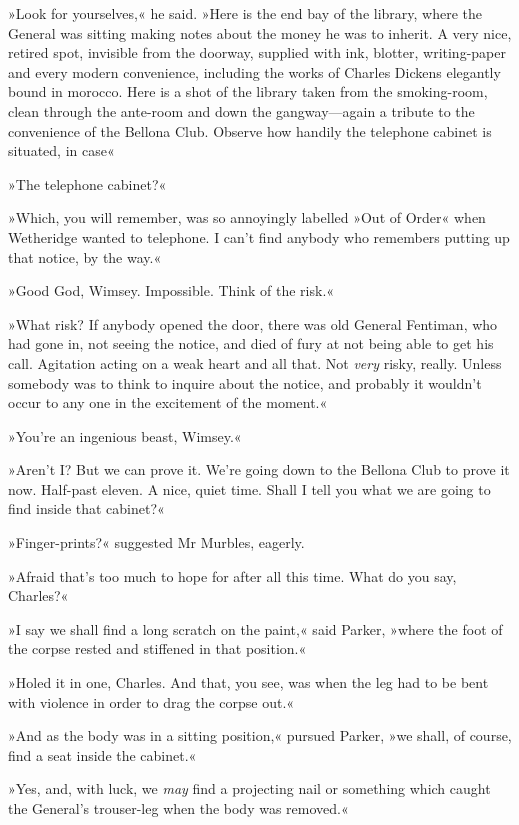 »Look for yourselves,« he said. »Here is the end bay of the library, where the General was sitting making notes about the money he was to inherit. A very nice, retired spot, invisible from the doorway, supplied with ink, blotter, writing-paper and every modern convenience, including the works of Charles Dickens elegantly bound in morocco. Here is a shot of the library taken from the smoking-room, clean through the ante-room and down the gangway—again a tribute to the convenience of the Bellona Club. Observe how handily the telephone cabinet is situated, in case\longdash«

»The telephone cabinet?«

»Which, you will remember, was so annoyingly labelled »Out of Order« when Wetheridge wanted to telephone. I can't find anybody who remembers putting up that notice, by the way.«

»Good God, Wimsey. Impossible. Think of the risk.«

»What risk? If anybody opened the door, there was old General Fentiman, who had gone in, not seeing the notice, and died of fury at not being able to get his call. Agitation acting on a weak heart and all that. Not \textit{very} risky, really. Unless somebody was to think to inquire about the notice, and probably it wouldn't occur to any one in the excitement of the moment.«

»You're an ingenious beast, Wimsey.«

»Aren't I? But we can prove it. We're going down to the Bellona Club to prove it now. Half-past eleven. A nice, quiet time. Shall I tell you what we are going to find inside that cabinet?«

»Finger-prints?« suggested Mr Murbles, eagerly.

»Afraid that's too much to hope for after all this time. What do you say, Charles?«

»I say we shall find a long scratch on the paint,« said Parker, »where the foot of the corpse rested and stiffened in that position.«

»Holed it in one, Charles. And that, you see, was when the leg had to be bent with violence in order to drag the corpse out.«

»And as the body was in a sitting position,« pursued Parker, »we shall, of course, find a seat inside the cabinet.«

»Yes, and, with luck, we \textit{may} find a projecting nail or something which caught the General's trouser-leg when the body was removed.«

